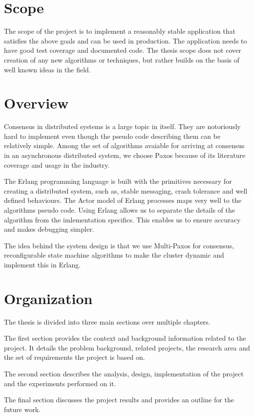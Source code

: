 \section{Scope}

The scope of the project is to implement a reasonably stable application that
satisfies the above goals and can be used in production. The application needs
to have good test coverage and documented code. The thesis scope does not cover
creation of any new algorithms or techniques, but rather builds on the basis of
well known ideas in the field.

\section{Overview}

Consensus in distributed systems is a large topic in itself. They are
notoriously hard to implement even though the pseudo code describing them can be
relatively simple. Among the set of algorithms avaiable for arriving at
consensus in an asynchronous distributed system, we choose Paxos because of its
literature coverage and usage in the industry.

The Erlang programming language is built with the primitives necessary for
creating a distributed system, such as, stable messaging, crash tolerance and
well defined behaviours. The Actor model of Erlang processes maps very well to 
the algorithms pseudo code. Using Erlang allows us to separate the details of
the algorithm from the imlementation specifics. This enables us to ensure
accuracy and makes debugging simpler.

The idea behind the system design is that we use Multi-Paxos for consensus,
reconfigurable state machine algorithms to make the cluster dynamic and
implement this in Erlang.

\section{Organization}
The thesis is divided into three main sections over multiple chapters.

The first section provides the context and background information related to the
project. It details the problem background, related projects, the research
area and the set of requirements the project is based on.

The second section describes the analysis, design, implementation of the project
and the experiments performed on it.

The final section discusses the project results and provides an outline for
the future work.

